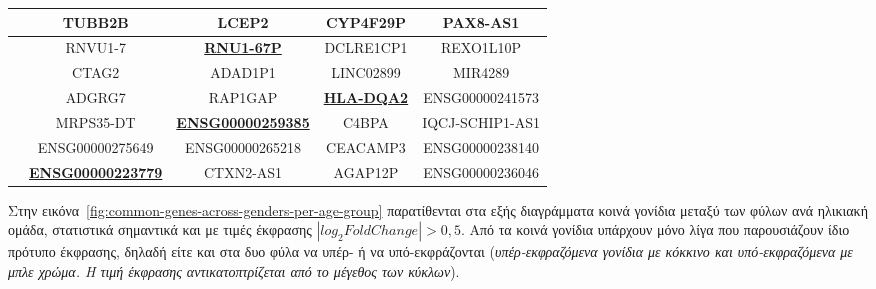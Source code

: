 \documentclass[12pt]{report}
\begin{document}
\begin{table}[ht]
\begin{tabular}{@{}>{\raggedright}p{1.3cm}cccc@{}}
                        & \cellcolor{blue!20}TUBB2B & \cellcolor{red!20}LCEP2 & \cellcolor{blue!20}CYP4F29P & \cellcolor{blue!20}PAX8-AS1 \\
                        \midrule
                        \multirow{6}{*}{Γυναίκες}
                        & \cellcolor{red!20}RNVU1-7 & \cellcolor{blue!20}\textbf{\underline{RNU1-67P}} & \cellcolor{blue!20}DCLRE1CP1 & \cellcolor{red!20}REXO1L10P \\
                        & \cellcolor{red!20}CTAG2 & \cellcolor{red!20}ADAD1P1 & \cellcolor{blue!20}LINC02899 & \cellcolor{red!20}MIR4289 \\
                        & \cellcolor{red!20}ADGRG7 & \cellcolor{blue!20}RAP1GAP & \cellcolor{blue!20}\textbf{\underline{HLA-DQA2}} & \cellcolor{red!20}ENSG00000241573 \\
                        & \cellcolor{red!20}MRPS35-DT & \cellcolor{blue!20}\textbf{\underline{ENSG00000259385}} & \cellcolor{red!20}C4BPA & \cellcolor{red!20}IQCJ-SCHIP1-AS1 \\
                        & \cellcolor{red!20}ENSG00000275649 & \cellcolor{blue!20}ENSG00000265218 & \cellcolor{blue!20}CEACAMP3 & \cellcolor{red!20}ENSG00000238140 \\
                        & \cellcolor{red!20}\textbf{\underline{ENSG00000223779}} & \cellcolor{blue!20}CTXN2-AS1 & \cellcolor{blue!20}AGAP12P & \cellcolor{red!20}ENSG00000236046 \\
                        
                        \bottomrule
                    \end{tabular}
                    \label{tab:top-6-degs-strata}
                \end{table}
                \par
                    Στην εικόνα~\ref{fig:common-genes-across-genders-per-age-group} παρατίθενται στα εξής διαγράμματα κοινά γονίδια μεταξύ των φύλων ανά ηλικιακή ομάδα, στατιστικά σημαντικά και με τιμές έκφρασης $|log_2FoldChange| > 0,5$. Από τα κοινά γονίδια υπάρχουν μόνο λίγα που παρουσιάζουν ίδιο πρότυπο έκφρασης, δηλαδή είτε και στα δυο φύλα να υπέρ- ή να υπό-εκφράζονται (\emph{υπέρ-εκφραζόμενα γονίδια με κόκκινο και υπό-εκφραζόμενα με μπλε χρώμα. Η τιμή έκφρασης αντικατοπτρίζεται από το μέγεθος των κύκλων}).
\end{document}
